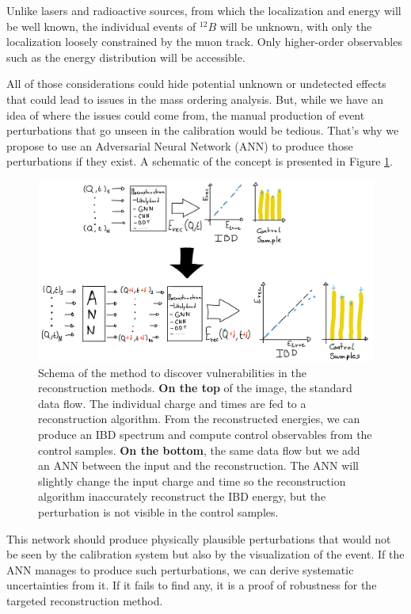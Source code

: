 \documentclass[../main.tex]{subfiles}
\begin{document}
Unlike lasers and radioactive sources, from which the localization and energy will be well known, the individual events of $^{12}B$ will be unknown, with only the localization loosely constrained by the muon track. Only higher-order observables such as the energy distribution will be accessible.

All of those considerations could hide potential unknown or undetected effects that could lead to issues in the mass ordering analysis. But, while we have an idea of where the issues could come from, the manual production of event perturbations that go unseen in the calibration would be tedious. That's why we propose to use an Adversarial Neural Network (ANN) to produce those perturbations if they exist. A schematic of the concept is presented in Figure \ref{fig:janne:method:schema}.

\begin{figure}[ht]
  \centering
  \includegraphics[width=\linewidth]{images/janne/ann_method.jpg}
  \caption{Schema of the method to discover vulnerabilities in the reconstruction methods. \textbf{On the top} of the image, the standard data flow. The individual charge and times are fed to a reconstruction algorithm. From the reconstructed energies, we can produce an IBD spectrum and compute control observables from the control samples. \textbf{On the bottom}, the same data flow but we add an ANN between the input and the reconstruction. The ANN will slightly change the input charge and time so the reconstruction algorithm inaccurately reconstruct the IBD energy, but the perturbation is not visible in the control samples.}
  \label{fig:janne:method:schema}
\end{figure}

This network should produce physically plausible perturbations that would not be seen by the calibration system but also by the visualization of the event. If the ANN manages to produce such perturbations, we can derive systematic uncertainties from it. If it fails to find any, it is a proof of robustness for the targeted reconstruction method.
\end{document}
